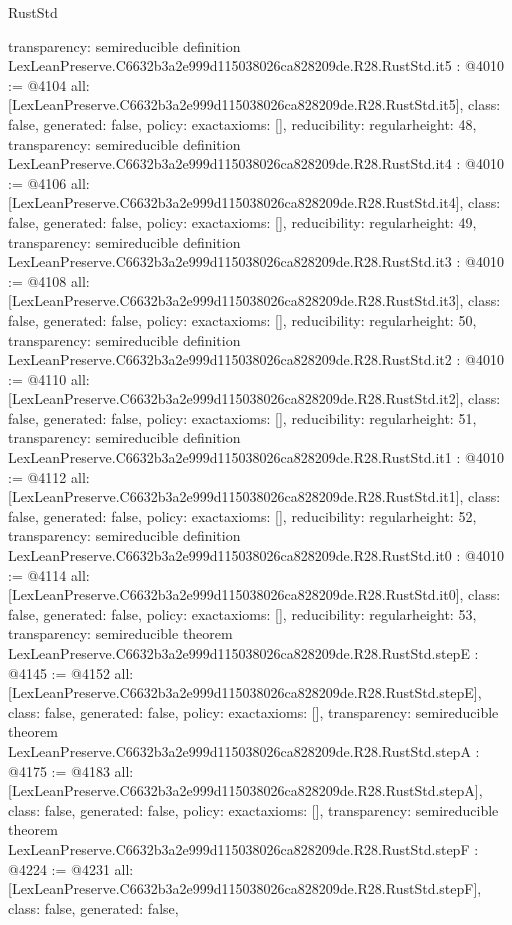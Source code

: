 \begin{lexlean}{RustStd}
\begin{coremodule}
{  transparency: semireducible
}
definition LexLeanPreserve.C6632b3a2e999d115038026ca828209de.R28.RustStd.it5 : @4010 := @4104 {
  all: [LexLeanPreserve.C6632b3a2e999d115038026ca828209de.R28.RustStd.it5],
  class: false,
  generated: false,
  policy: exact{axioms: []},
  reducibility: regular{height: 48},
  transparency: semireducible
}
definition LexLeanPreserve.C6632b3a2e999d115038026ca828209de.R28.RustStd.it4 : @4010 := @4106 {
  all: [LexLeanPreserve.C6632b3a2e999d115038026ca828209de.R28.RustStd.it4],
  class: false,
  generated: false,
  policy: exact{axioms: []},
  reducibility: regular{height: 49},
  transparency: semireducible
}
definition LexLeanPreserve.C6632b3a2e999d115038026ca828209de.R28.RustStd.it3 : @4010 := @4108 {
  all: [LexLeanPreserve.C6632b3a2e999d115038026ca828209de.R28.RustStd.it3],
  class: false,
  generated: false,
  policy: exact{axioms: []},
  reducibility: regular{height: 50},
  transparency: semireducible
}
definition LexLeanPreserve.C6632b3a2e999d115038026ca828209de.R28.RustStd.it2 : @4010 := @4110 {
  all: [LexLeanPreserve.C6632b3a2e999d115038026ca828209de.R28.RustStd.it2],
  class: false,
  generated: false,
  policy: exact{axioms: []},
  reducibility: regular{height: 51},
  transparency: semireducible
}
definition LexLeanPreserve.C6632b3a2e999d115038026ca828209de.R28.RustStd.it1 : @4010 := @4112 {
  all: [LexLeanPreserve.C6632b3a2e999d115038026ca828209de.R28.RustStd.it1],
  class: false,
  generated: false,
  policy: exact{axioms: []},
  reducibility: regular{height: 52},
  transparency: semireducible
}
definition LexLeanPreserve.C6632b3a2e999d115038026ca828209de.R28.RustStd.it0 : @4010 := @4114 {
  all: [LexLeanPreserve.C6632b3a2e999d115038026ca828209de.R28.RustStd.it0],
  class: false,
  generated: false,
  policy: exact{axioms: []},
  reducibility: regular{height: 53},
  transparency: semireducible
}
theorem LexLeanPreserve.C6632b3a2e999d115038026ca828209de.R28.RustStd.stepE : @4145 := @4152 {
  all: [LexLeanPreserve.C6632b3a2e999d115038026ca828209de.R28.RustStd.stepE],
  class: false,
  generated: false,
  policy: exact{axioms: []},
  transparency: semireducible
}
theorem LexLeanPreserve.C6632b3a2e999d115038026ca828209de.R28.RustStd.stepA : @4175 := @4183 {
  all: [LexLeanPreserve.C6632b3a2e999d115038026ca828209de.R28.RustStd.stepA],
  class: false,
  generated: false,
  policy: exact{axioms: []},
  transparency: semireducible
}
theorem LexLeanPreserve.C6632b3a2e999d115038026ca828209de.R28.RustStd.stepF : @4224 := @4231 {
  all: [LexLeanPreserve.C6632b3a2e999d115038026ca828209de.R28.RustStd.stepF],
  class: false,
  generated: false,
}
\end{coremodule}
\end{lexlean}

